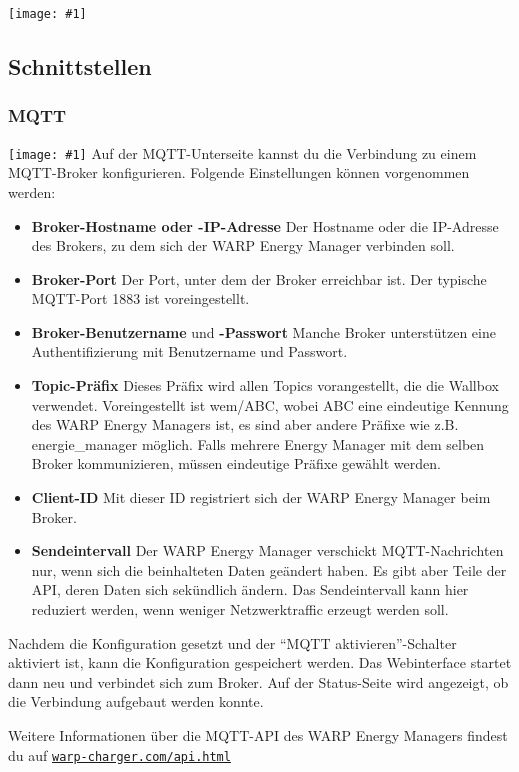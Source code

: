 \documentclass[a4paper,10pt]{article}
\newcommand{\gfx}[1]{\texttt{[image: \#1]}}
\newcommand\rurl[2]{%
  \href{#1}{\nolinkurl{#2}}%
}
\begin{document}
\begin{multicols*}{2}
	\gfx{./img/resized/web_wireguard}

	\subsection{Schnittstellen}
	\subsubsection{MQTT}
	\label{mqtt-interface}

	\gfx{./img/resized/web_mqtt}
	Auf der MQTT-Unterseite kannst du die Verbindung zu einem MQTT-Broker konfigurieren. Folgende Einstellungen können vorgenommen werden:
	\begin{itemize}
		\item \textbf{Broker-Hostname oder -IP-Adresse} Der Host\-name oder die
		IP-Adresse des Brokers, zu dem sich der WARP Energy Manager verbinden soll.
		\item \textbf{Broker-Port} Der Port, unter dem der Broker erreichbar ist. Der typische MQTT-Port 1883 ist voreingestellt.
		\item \textbf{Broker-Benutzername} und \textbf{-Passwort} Manche Broker unterstützen eine Authentifizierung mit Benutzername und Passwort.
		\item \textbf{Topic-Präfix} Dieses Präfix wird allen Topics vorangestellt, die die Wallbox verwendet.
		      Voreingestellt ist wem/ABC, wobei ABC eine eindeutige Kennung des
			  WARP Energy Managers ist,
		      es sind aber andere Präfixe wie z.B. energie\_manager möglich.
		      Falls mehrere Energy Manager mit dem selben Broker kommunizieren,
		      müssen eindeutige Präfixe gewählt werden.
		\item \textbf{Client-ID} Mit dieser ID registriert sich der WARP Energy Manager beim Broker.
		\item \textbf{Sendeintervall} Der WARP Energy Manager verschickt MQTT-Nachrichten nur, wenn sich die beinhalteten Daten geändert haben.
			Es gibt aber Teile der API, deren Daten sich sekündlich ändern. Das Sendeintervall kann hier reduziert werden, wenn weniger Netzwerktraffic
			erzeugt werden soll.
	\end{itemize}
	Nachdem die Konfiguration gesetzt und der \enquote{MQTT aktivieren}-Schalter aktiviert ist, kann die Konfiguration gespeichert werden.
	Das Webinterface startet dann neu und verbindet sich zum Broker.
	Auf der Status-Seite wird angezeigt, ob die Verbindung aufgebaut werden konnte.

	Weitere Informationen über die MQTT-API des WARP Energy Managers findest du auf \rurl{https://warp-charger.com/api.html}{warp-charger.com/api.html}


\end{multicols*}
\end{document}
